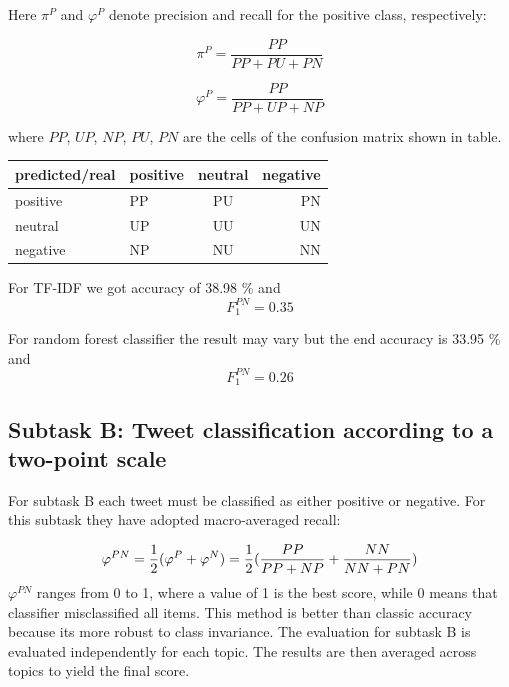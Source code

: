 \documentclass[runningheads,a4paper]{llncs}
\begin{document}
Here $\pi^P$ and $\varphi^P$ denote precision and recall for the positive class, respectively: 

\begin{equation}
\pi^P = \frac{PP}{PP + PU + PN}
\end{equation}

\begin{equation}
\varphi^P = \frac{PP}{PP + UP + NP}
\end{equation}

where $PP$, $UP$, $NP$, $PU$, $PN$ are the cells of the confusion matrix shown in table. 

\begin{center}
  \begin{tabular}{ | l | l | c | r |}
    \hline
  predicted/real   & positive & neutral & negative \\ \hline
   positive  & PP & PU & PN \\ \hline
   neutral  & UP & UU & UN \\ \hline
   negative  & NP & NU & NN \\
    \hline
  \end{tabular}
\end{center}

For TF-IDF we got accuracy of 38.98 \% and
\begin{equation}
F^{PN}_1 = 0.35
\end{equation}

For random forest classifier the result may vary but the end accuracy is 33.95 \% and
\begin{equation}
F^{PN}_1 = 0.26
\end{equation}

\subsection{Subtask B: Tweet classification according to a two-point scale}
For subtask B each tweet must be classified as either positive or negative. For this subtask they have adopted macro-averaged recall: 

\begin{equation}
\varphi^{PN} = \frac{1}{2}(\varphi^P + \varphi^N) \\
= \frac{1}{2}(\frac{PP}{PP + NP} + \frac{NN}{NN + PN})
\end{equation}
$\varphi^{PN}$ ranges from 0 to 1, where a value of 1 is the best score, while 0 means that classifier misclassified all items. This method is better than classic accuracy because its more robust to class invariance. The evaluation for subtask B is evaluated independently for each topic. The results are then averaged across topics to yield the final score.
\end{document}
